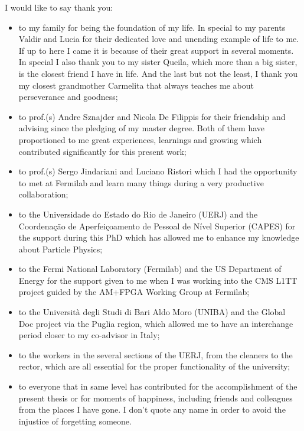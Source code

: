 \documentclass[a4paper,12pt,oneside,onecolumn,final,fleqn]{repUERJ}
\begin{document}
I would like to say thank you:
\begin{itemize}
\item to my family for being the foundation of my life. In special to my parents Valdir and Lucia for their dedicated love and unending example of life to me. If up to here I came it is because of their great support in several moments. In special I also thank you to my sister Queila, which more than a big sister, is the closest friend I have in life. And the last but not the least, I thank you my closest grandmother Carmelita that always teaches me about perseverance and goodness;
\item to prof.(s) Andre Sznajder and Nicola De Filippis for their friendship and advising since the pledging of my master degree. Both of them have proportioned to me great experiences, learnings and growing which contributed significantly for this present work;
\item to prof.(s) Sergo Jindariani and Luciano Ristori which I had the opportunity to met at Fermilab and learn many things during a very productive collaboration;
\item to the Universidade do Estado do Rio de Janeiro (UERJ) and the Coordenação de Aperfeiçoamento de Pessoal de Nível Superior (CAPES) for the support during this PhD which has allowed me to enhance my knowledge about Particle Physics;
\item to the Fermi National Laboratory (Fermilab) and the US Department of Energy for the support given to me when I was working into the CMS L1TT project guided by the AM+FPGA Working Group at Fermilab;
\item to the Università degli Studi di Bari Aldo Moro (UNIBA) and the Global Doc project via the Puglia region, which allowed me to have an interchange period closer to my co-advisor in Italy;
\item to the workers in the several sections of the UERJ, from the cleaners to the rector, which are all essential for the proper functionality of the university;
\item to everyone that in same level has contributed for the accomplishment of the present thesis or for moments of happiness, including friends and colleagues from the places I have gone. I don't quote any name in order to avoid the injustice of forgetting someone.
\end{itemize}
\end{document}
